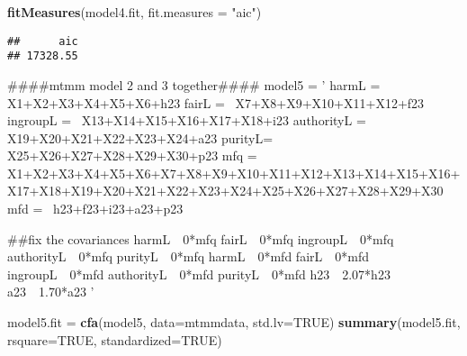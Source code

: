 \documentclass[english,man]{apa6}
\newenvironment{Shaded}{\begin{snugshade}}{\end{snugshade}}
\newcommand{\KeywordTok}[1]{\textcolor[rgb]{0.13,0.29,0.53}{\textbf{#1}}}
\newcommand{\DataTypeTok}[1]{\textcolor[rgb]{0.13,0.29,0.53}{#1}}
\newcommand{\StringTok}[1]{\textcolor[rgb]{0.31,0.60,0.02}{#1}}
\newcommand{\OtherTok}[1]{\textcolor[rgb]{0.56,0.35,0.01}{#1}}
\newcommand{\NormalTok}[1]{#1}
\newcounter{author}
\theoremstyle{definition}
\theoremstyle{definition}
\theoremstyle{definition}
\theoremstyle{remark}
\begin{document}
\begin{Shaded}
\begin{Highlighting}[]
\KeywordTok{fitMeasures}\NormalTok{(model4.fit, }\DataTypeTok{fit.measures =} \StringTok{"aic"}\NormalTok{)}
\end{Highlighting}
\end{Shaded}

\begin{verbatim}
##      aic 
## 17328.55
\end{verbatim}

\begin{Shaded}
\begin{Highlighting}[]
\NormalTok{####mtmm model 2 and 3 together####}
\NormalTok{model5 =}\StringTok{ '}
\StringTok{harmL =~ X1+X2+X3+X4+X5+X6+h23}
\StringTok{fairL =~ X7+X8+X9+X10+X11+X12+f23}
\StringTok{ingroupL =~ X13+X14+X15+X16+X17+X18+i23}
\StringTok{authorityL =~ X19+X20+X21+X22+X23+X24+a23}
\StringTok{purityL=~ X25+X26+X27+X28+X29+X30+p23}
\StringTok{mfq =~ X1+X2+X3+X4+X5+X6+X7+X8+X9+X10+X11+X12+X13+X14+X15+X16+X17+X18+X19+X20+X21+X22+X23+X24+X25+X26+X27+X28+X29+X30}
\StringTok{mfd =~ h23+f23+i23+a23+p23}

\StringTok{##fix the covariances}
\StringTok{harmL~~0*mfq}
\StringTok{fairL~~0*mfq}
\StringTok{ingroupL~~0*mfq}
\StringTok{authorityL~~0*mfq}
\StringTok{purityL~~0*mfq}
\StringTok{harmL~~0*mfd}
\StringTok{fairL~~0*mfd}
\StringTok{ingroupL~~0*mfd}
\StringTok{authorityL~~0*mfd}
\StringTok{purityL~~0*mfd}
\StringTok{h23~~2.07*h23}
\StringTok{a23~~1.70*a23}
\StringTok{'}

\NormalTok{model5.fit =}\StringTok{ }\KeywordTok{cfa}\NormalTok{(model5, }\DataTypeTok{data=}\NormalTok{mtmmdata, }\DataTypeTok{std.lv=}\OtherTok{TRUE}\NormalTok{)}
\KeywordTok{summary}\NormalTok{(model5.fit, }\DataTypeTok{rsquare=}\OtherTok{TRUE}\NormalTok{, }\DataTypeTok{standardized=}\OtherTok{TRUE}\NormalTok{)}
\end{Highlighting}
\end{Shaded}
\end{document}
